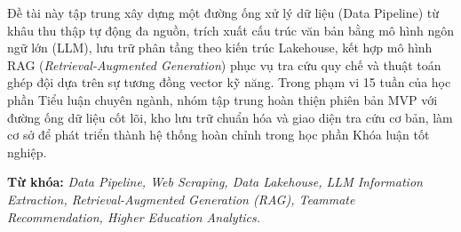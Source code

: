 \documentclass[11pt,a4paper]{article}
\begin{document}
Đề tài này tập trung xây dựng một đường ống xử lý dữ liệu (Data Pipeline) từ khâu thu thập tự động đa nguồn, trích xuất cấu trúc văn bản bằng mô hình ngôn ngữ lớn (LLM), lưu trữ phân tầng theo kiến trúc Lakehouse, kết hợp mô hình RAG (\textit{Retrieval-Augmented Generation}) phục vụ tra cứu quy chế và thuật toán ghép đội dựa trên sự tương đồng vector kỹ năng. Trong phạm vi 15 tuần của học phần Tiểu luận chuyên ngành, nhóm tập trung hoàn thiện phiên bản MVP với đường ống dữ liệu cốt lõi, kho lưu trữ chuẩn hóa và giao diện tra cứu cơ bản, làm cơ sở để phát triển thành hệ thống hoàn chỉnh trong học phần Khóa luận tốt nghiệp.

\noindent\textbf{Từ khóa:} \textit{Data Pipeline, Web Scraping, Data Lakehouse, LLM Information Extraction, Retrieval-Augmented Generation (RAG), Teammate Recommendation, Higher Education Analytics.}
\end{document}
